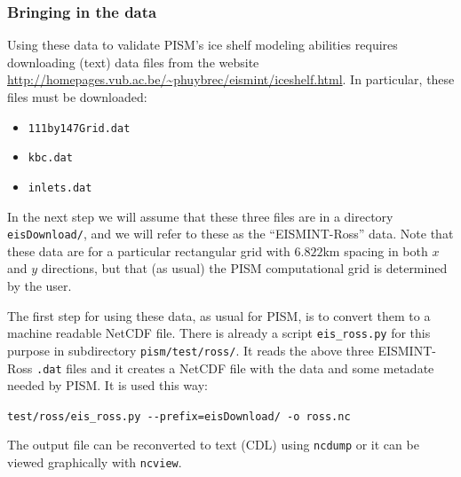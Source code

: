 \documentclass[11pt,final]{amsart}
\begin{document}
\subsubsection*{Bringing in the data}  Using these data to validate PISM's ice shelf modeling abilities requires downloading (text) data files from the website \url{http://homepages.vub.ac.be/~phuybrec/eismint/iceshelf.html}.  In particular, these files must be downloaded:
\begin{itemize}
\item \verb|111by147Grid.dat|
\item \verb|kbc.dat|
\item \verb|inlets.dat|
\end{itemize}
In the next step we will assume that these three files are in a directory \verb|eisDownload/|, and we will refer to these as the ``EISMINT-Ross'' data.  Note that these data are for a particular rectangular grid with $6.822$km spacing in both $x$ and $y$ directions, but that (as usual) the PISM computational grid is determined by the user.

The first step for using these data, as usual for PISM, is to convert them to a machine readable NetCDF file.  There is already a script \verb|eis_ross.py| for this purpose in subdirectory \verb|pism/test/ross/|.  It  reads the above three EISMINT-Ross \verb|.dat| files and it creates a NetCDF file with the data and some metadate needed by PISM.  It is used this way:

\verb|test/ross/eis_ross.py --prefix=eisDownload/ -o ross.nc|

\noindent The output file can be reconverted to text (CDL) using \verb|ncdump| or it can be viewed graphically with \verb|ncview|.
\end{document}
